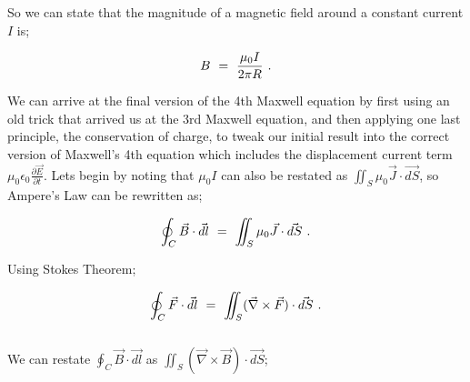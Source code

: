 \documentclass{article}
\begin{document}
So we can state that the magnitude of a magnetic field around a constant current \begin{math} I \end{math} is;

\begin{equation} \label{eb-eq-51-16}
B \hspace{0.125cm} = \hspace{0.125cm} \frac{\mu_{0} I}{2 \pi R} \hspace{0.125cm} .
\end{equation}

We can arrive at the final version of the 4th Maxwell equation by first using an old trick that arrived us at the 3rd Maxwell equation, and then applying one last principle, the conservation of charge, to tweak our initial result into the correct version of Maxwell's 4th equation which includes the displacement current term \begin{math} \mu_{0} \epsilon_{0} \frac{\partial{\vec{E}}}{\partial{t}} \end{math}. Lets begin by noting that \begin{math} \mu_{0} I \end{math} can also be restated as \begin{math} \iint_{S} \mu_{0} \vec{J}\cdot\vec{dS} \end{math}, so Ampere's Law can be rewritten as;

\begin{equation} \label{eb-eq-51-17}
\oint_{C} \vec{B} \cdot \vec{dl} \hspace{0.125cm} = \hspace{0.125cm} \iint_{S} \mu_{0} \vec{J}\cdot\vec{dS} \hspace{0.125cm} .
\end{equation}

Using Stokes Theorem;

\begin{equation} \label{eb-eq-51-18}
\oint_{C} \vec{F} \cdot \vec{dl} \hspace{0.125cm} = \hspace{0.125cm} \iint_{S} (\vec{\nabla}\times\vec{F})\cdot\vec{dS} \hspace{0.125cm} .
\end{equation}
\\
We can restate \begin{math} \oint_{C} \vec{B} \cdot \vec{dl} \end{math} as \begin{math} \iint_{S} (\vec{\nabla}\times\vec{B})\cdot\vec{dS} \end{math};
\end{document}
